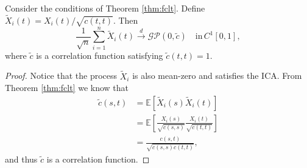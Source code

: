 \begin{corollary}
    Consider the conditions of Theorem  \ref{thm:fclt}. Define $\tilde{X}_i(t) = X_i(t) / \sqrt{c(t,
    t)}$. Then
    \[
        \frac{1}{\sqrt{n}} \sum_{i = 1}^n \tilde{X}_i(t) \overset{d}{\to} \mathcal{GP}(0, \tilde{c})
        \quad \text{in} \, C^1[0, 1],
    \]
    where $\tilde{c}$ is a correlation function satisfying $\tilde{c}(t, t) = 1$.
\end{corollary}
\begin{proof}
    Notice that the process $\tilde{X}_i$ is also mean-zero and satisfies the ICA. From Theorem
    \ref{thm:fclt} we know that
    \begin{align}
        \tilde{c}(s, t) &= \mathbb{E}[\tilde{X}_i(s)\tilde{X}_i(t)] \\
        &= \mathbb{E}\left[\frac{X_i(s)}{\sqrt{c(s, s)}} \frac{X_i(t)}{\sqrt{c(t, t)}}\right] \\
        &= \frac{c(s, t)}{\sqrt{c(s, s) c(t, t)}},
    \end{align}
    and thus $\tilde{c}$ is a correlation function.
\end{proof}
